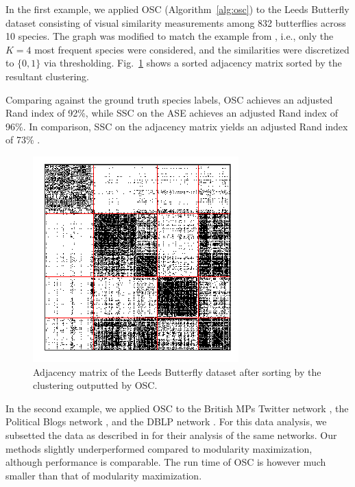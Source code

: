 \documentclass[12pt]{article}
\begin{document}
In the first example, we applied OSC (Algorithm~\ref{alg:osc}) to the Leeds Butterfly
dataset \citep{Wang_2018} consisting of visual similarity measurements
among 832 butterflies across 10 species. The graph was modified to match
the example from \citet{noroozi2019estimation}, i.e., only the $K=4$ most
frequent species were considered, and the similarities were discretized
to \(\{0, 1\}\) via thresholding. Fig.~\ref{fig:butterfly} shows a
sorted adjacency matrix sorted by the resultant clustering.

Comparing against the ground truth species labels, OSC achieves an adjusted Rand index of 92\%, while SSC on the ASE achieves an adjusted Rand index of 96\%. In comparison, SSC on the adjacency matrix yields an adjusted Rand index of 73\% \citep{noroozi2019estimation}.

\begin{figure}[H]

{\centering \includegraphics{summary_files/figure-latex/butterfly-1}

}

\caption{Adjacency matrix of the Leeds Butterfly dataset 
after sorting by the clustering outputted by OSC.}\label{fig:butterfly}
\end{figure}

In the second example, we applied OSC to the British MPs Twitter network
\citep{greene2013producing}, the Political Blogs network
\citep{10.1145/1134271.1134277}, and the DBLP network
\citep{NIPS2009_3855, 10.1007/978-3-642-15880-3_42}. For this data
analysis, we subsetted the data as described in
\citet{307cbeb9b1be48299388437423d94bf1} for their analysis of the
same networks. Our methods slightly underperformed compared to modularity
maximization, although performance is comparable. The run time of OSC
is however much smaller than that of modularity maximization.
\end{document}
